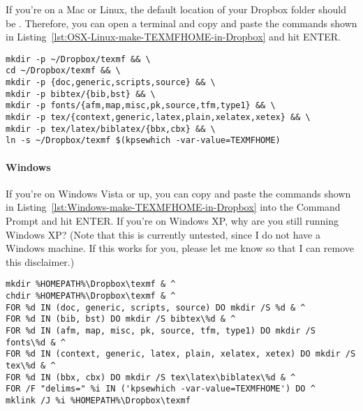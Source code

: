 If you're on a Mac or Linux, the default location of your Dropbox folder should be .
Therefore, you can open a terminal and copy and paste the commands shown in Listing~\ref{lst:OSX-Linux-make-TEXMFHOME-in-Dropbox} and hit ENTER.

\begin{listing}[htbp]
	\centering
	\begin{verbatim}
mkdir -p ~/Dropbox/texmf && \
cd ~/Dropbox/texmf && \
mkdir -p {doc,generic,scripts,source} && \
mkdir -p bibtex/{bib,bst} && \
mkdir -p fonts/{afm,map,misc,pk,source,tfm,type1} && \
mkdir -p tex/{context,generic,latex,plain,xelatex,xetex} && \
mkdir -p tex/latex/biblatex/{bbx,cbx} && \
ln -s ~/Dropbox/texmf $(kpsewhich -var-value=TEXMFHOME)
	\end{verbatim}
	\caption{Make a TDS-compliant directory in Dropbox and symlink it into TEXMFHOME on OSX or Linux}
	\label{lst:OSX-Linux-make-TEXMFHOME-in-Dropbox}
\end{listing}

\paragraph{Windows}

If you're on Windows Vista or up, you can copy and paste the commands shown in Listing~\ref{lst:Windows-make-TEXMFHOME-in-Dropbox} into the Command Prompt and hit ENTER.
If you're on Windows XP, why are you still running Windows XP?
(Note that this is currently untested, since I do not have a Windows machine.
If this works for you, please let me know so that I can remove this disclaimer.)

\begin{listing}[htbp]
	\centering
	\begin{verbatim}
mkdir %HOMEPATH%\Dropbox\texmf & ^
chdir %HOMEPATH%\Dropbox\texmf & ^
FOR %d IN (doc, generic, scripts, source) DO mkdir /S %d & ^
FOR %d IN (bib, bst) DO mkdir /S bibtex\%d & ^
FOR %d IN (afm, map, misc, pk, source, tfm, type1) DO mkdir /S fonts\%d & ^
FOR %d IN (context, generic, latex, plain, xelatex, xetex) DO mkdir /S tex\%d & ^
FOR %d IN (bbx, cbx) DO mkdir /S tex\latex\biblatex\%d & ^
FOR /F "delims=" %i IN ('kpsewhich -var-value=TEXMFHOME') DO ^
mklink /J %i %HOMEPATH%\Dropbox\texmf
	\end{verbatim}
	\caption{Make a TDS-compliant directory in Dropbox and symlink it into TEXMFHOME on Windows}
	\label{lst:Windows-make-TEXMFHOME-in-Dropbox}
\end{listing}

